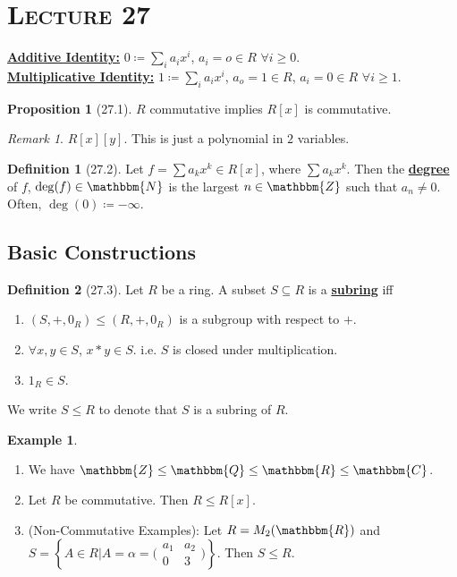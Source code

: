 \documentclass{article}
\newcommand{\N}{\mathbbm{N}}
\newcommand{\Z}{\mathbbm{Z}}
\newcommand{\Q}{\mathbbm{Q}}
\newcommand{\R}{\mathbbm{R}}
\newcommand{\C}{\mathbbm{C}}
\newcommand{\coleq}{\coloneqq}
\newcommand{\define}[1]{\textbf{\underline{#1}}}
\renewcommand{\Subset}{\subseteq}
\theoremstyle{definition}
\newtheorem*{defn}{Definition}
\newtheorem*{prop}{Proposition}
\newtheorem*{ex}{Example}
\theoremstyle{remark}
\newtheorem*{rmk}{Remark}
\begin{document}
    \section*{\textbf{\textsc{Lecture 27}}}{
        \define{Additive Identity:} $0\coleq \sum_i a_ix^i$, $a_i=o \in R$ $\forall i \geq 0$.\\
     
        \noindent\define{Multiplicative Identity:} $1\coleq \sum_i a_ix^i$, $a_o=1 \in R$, $a_i=0 \in R$ $\forall i \geq 1$.
     
        \begin{prop}[27.1]
            $R$ commutative implies $R[x]$ is commutative.
        \end{prop}
     
        \begin{rmk}
            $R[x][y]$. This is just a polynomial in $2$ variables.
        \end{rmk}
        
        \begin{defn}[27.2]
            Let $f=\sum a_kx^k \in R[x]$, where $\sum a_k x^k$. Then the \define{degree} of $f$, $\deg(f) \in \N$ is the largest $n \in \Z$ such that $a_n\neq 0$. Often, $\deg(0)\coleq -\infty$.
        \end{defn}
        
        \subsection*{Basic Constructions}{
            \begin{defn}[27.3]
                Let $R$ be a ring. A subset $S \Subset R$ is a \define{subring} iff
                \begin{enumerate}
                    \item $(S,+,0_R) \leq (R,+,0_R)$ is a subgroup with respect to $+$.
                    \item $\forall x,y \in S$, $x*y \in S$. i.e. $S$ is closed under multiplication.
                    \item $1_R \in S$.
                \end{enumerate}
                We write $S\leq R$ to denote that $S$ is a subring of $R$.
            \end{defn}
        }
            \begin{ex}
                \begin{enumerate}
                    \item We have $\Z \leq \Q \leq \R \leq \C$.
                    \item Let $R$ be commutative. Then $R \leq R[x]$.
                    \item (Non-Commutative Examples): Let $R=M_2(\R)$ and $S=\left\{A\in R|A=\alpha=\big(\begin{smallmatrix} a_1&a_2 \\ 0&3 \end{smallmatrix}\big)\right\}$. Then $S \leq R$.
                \end{enumerate}
            \end{ex}
            
}
\end{document}

